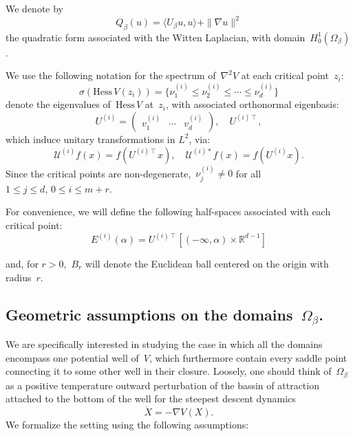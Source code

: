 \documentclass[10pt]{article}
\newcommand{\R}{\mathbb{R}}
\newcommand{\Hess}{\mathrm{Hess}\,}
\newcommand{\1}{\mathbbm 1}
\newcommand{\hessPassage}[2][]{U^{(#2)#1}} %
\newcommand{\hessEigvec}[2]{v^{(#1)}_{#2}} %
\newcommand{\hessEigval}[2]{\nu^{(#1)}_{#2}} %
\newcommand{\halfSpace}[1]{E^{(#1)}}
\begin{document}
    We denote by
    \begin{equation}
        \label{eq:witten_quad_form}
        Q_\beta(u) = \langle U_\beta u ,u \rangle + \|\nabla u\|^2
    \end{equation}
    the quadratic form associated with the Witten Laplacian, with domain~$H_0^1(\Omega_\beta)$.

    We use the following notation for the spectrum of~$\nabla^2 V$ at each critical point~$z_i$:
    \[\sigma(\Hess V(z_i)) = \{\hessEigval{i}{1} \leq \hessEigval{i}{2} \leq \dotsm \leq \hessEigval{i}{d}\}\]
    denote the eigenvalues of~$\Hess V$ at~$z_i$, with associated orthonormal eigenbasis:
    \[U^{(i)} =\begin{pmatrix}\hessEigvec{i}{1}&\dotsm&\hessEigvec{i}{d}\end{pmatrix},\quad U^{(i)\intercal},\]
    which induce unitary transformations in $L^2$, via:
   ~\begin{equation}
    \label{eq:}
     \mathcal U^{(i)} f(x) = f\left( U^{(i)\intercal}x\right),\quad \mathcal U^{(i)*} f(x) = f\left( U^{(i)}x\right).
   \end{equation}
    Since the critical points are non-degenerate,~$\nu_j^{(i)} \neq 0$ for all~$1\leq j\leq d,\,0\leq i \leq m+r$.

    For convenience, we will define the following half-spaces associated with each critical point:
    \begin{equation}
        \label{eq:half_space}
        \halfSpace{i}(\alpha) = \hessPassage[\intercal]{i}\left[(-\infty,\alpha)\times\R^{d-1}\right]
    \end{equation}

    and, for $r>0$,~$B_r$ will denote the Euclidean ball centered on the origin with radius~$r$.
    \subsection{Geometric assumptions on the domains~$\Omega_\beta$.\newline}
    We are specifically interested in studying the case in which all the domains encompass one potential well of~$V$, which furthermore contain every saddle point connecting it to some other well in their closure.
    Loosely, one should think of~$\Omega_\beta$ as a positive temperature outward perturbation of the bassin of attraction attached to the bottom of the well for the steepest descent dynamics
    \begin{equation}
        \label{eq:gradient_flow}
        \dot X = -\nabla V(X).
    \end{equation}
    We formalize the setting using the following assumptions:
\end{document}
